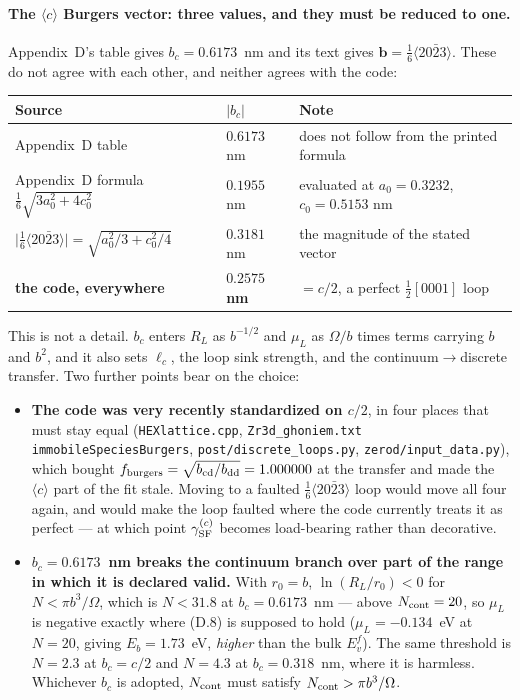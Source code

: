 \documentclass[11pt]{article}
\newcommand{\cloop}{\ensuremath{\langle c\rangle}}
\newcommand{\fbk}{\discretionary{}{}{}}   %
\newcommand{\file}[1]{\texttt{\small #1}}
\newcommand{\GSF}{\gamma_{\rm SF}}
\begin{document}
\paragraph{The \cloop{} Burgers vector: three values, and they must be reduced
to one.}
Appendix~D's table gives $b_c=0.6173$~nm and its text gives
$\mathbf b=\tfrac16\langle20\bar23\rangle$.  These do not agree with each
other, and neither agrees with the code:

\begin{center}\small
\begin{tabular}{@{}p{}p{}p{}@{}}
\toprule
\textbf{Source} & $|b_c|$ & \textbf{Note}\\
\midrule
Appendix~D table & $0.6173$ nm & does not follow from the printed formula\\
Appendix~D formula $\tfrac16\sqrt{3a_0^2+4c_0^2}$ & $0.1955$ nm & evaluated at
  $a_0=0.3232$, $c_0=0.5153$ nm\\
$\bigl|\tfrac16\langle20\bar23\rangle\bigr|
  =\sqrt{a_0^2/3+c_0^2/4}$ & $0.3181$ nm & the magnitude of the stated
  vector\\
\textbf{the code, everywhere} & $\mathbf{0.2575}$ \textbf{nm} & $=c/2$,
  a perfect $\tfrac12[0001]$ loop\\
\bottomrule
\end{tabular}
\end{center}

This is not a detail.  $b_c$ enters $R_L$ as $b^{-1/2}$ and $\mu_L$ as
$\Omega/b$ times terms carrying $b$ and $b^{2}$, and it also sets $\ell_c$,
the loop sink strength, and the continuum$\to$discrete transfer.  Two further
points bear on the choice:

\begin{itemize}
\item \textbf{The code was very recently standardized on $c/2$}, in four
  places that must stay equal (\file{HEXlattice.\fbk cpp},
  \file{Zr3d\_\fbk ghoniem.\fbk txt} \verb|immobileSpeciesBurgers|,
  \file{post/\fbk discrete\_\fbk loops.\fbk py},
  \file{zerod/\fbk input\_\fbk data.\fbk py}), which bought
  $f_{\rm burgers}=\sqrt{b_{\rm cd}/b_{\rm dd}}=1.000000$ at the transfer and
  made the \cloop{} part of the fit stale.  Moving to a faulted
  $\tfrac16\langle20\bar23\rangle$ loop would move all four again, and would
  make the loop faulted where the code currently treats it as perfect --- at
  which point $\GSF^{(c)}$ becomes load-bearing rather than decorative.
\item \textbf{$b_c=0.6173$~nm breaks the continuum branch over part of the
  range in which it is declared valid.}  With $r_0=b$, $\ln(R_L/r_0)<0$ for
  $N<\pi b^{3}/\Omega$, which is $N<31.8$ at $b_c=0.6173$~nm --- above
  $N_{\rm cont}=20$, so $\mu_L$ is negative exactly where (D.8) is supposed to
  hold ($\mu_L=-0.134$~eV at $N=20$, giving $E_b=1.73$~eV, \emph{higher} than
  the bulk $E_v^{f}$).  The same threshold is $N=2.3$ at $b_c=c/2$ and
  $N=4.3$ at $b_c=0.318$~nm, where it is harmless.  Whichever $b_c$ is
  adopted, $N_{\rm cont}$ must satisfy $N_{\rm cont}>\pi b^{3}/\Omega$.
\end{itemize}
\end{document}
